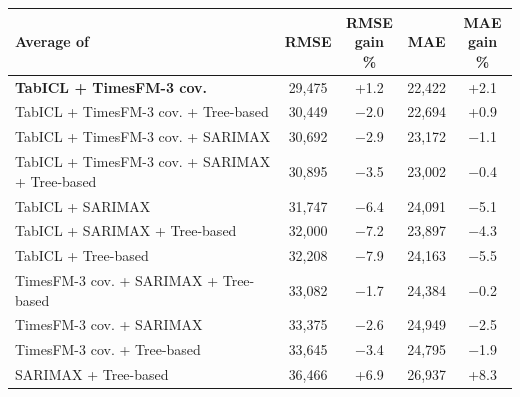 \setlength{\tabcolsep}{4pt}
\begin{tabular}{lcccc}
\toprule
Average of & RMSE & \shortstack{RMSE\\gain \%} & MAE & \shortstack{MAE\\gain \%} \\
\midrule
\textbf{TabICL + TimesFM-3 cov.} & 29,475 & +1.2 & 22,422 & +2.1 \\
TabICL + TimesFM-3 cov. + Tree-based & 30,449 & $-$2.0 & 22,694 & +0.9 \\
TabICL + TimesFM-3 cov. + SARIMAX & 30,692 & $-$2.9 & 23,172 & $-$1.1 \\
TabICL + TimesFM-3 cov. + SARIMAX + Tree-based & 30,895 & $-$3.5 & 23,002 & $-$0.4 \\
TabICL + SARIMAX & 31,747 & $-$6.4 & 24,091 & $-$5.1 \\
TabICL + SARIMAX + Tree-based & 32,000 & $-$7.2 & 23,897 & $-$4.3 \\
TabICL + Tree-based & 32,208 & $-$7.9 & 24,163 & $-$5.5 \\
TimesFM-3 cov. + SARIMAX + Tree-based & 33,082 & $-$1.7 & 24,384 & $-$0.2 \\
TimesFM-3 cov. + SARIMAX & 33,375 & $-$2.6 & 24,949 & $-$2.5 \\
TimesFM-3 cov. + Tree-based & 33,645 & $-$3.4 & 24,795 & $-$1.9 \\
SARIMAX + Tree-based & 36,466 & +6.9 & 26,937 & +8.3 \\
\bottomrule
\end{tabular}
